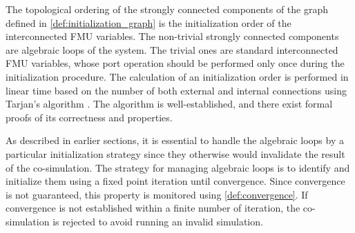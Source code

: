 The topological ordering of the strongly connected components of the graph defined in \cref{def:initialization_graph} is the initialization order of the interconnected FMU variables. 
The non-trivial strongly connected components are algebraic loops of the system. The trivial ones are standard interconnected FMU variables, whose port operation should be performed only once during the initialization procedure.
The calculation of an initialization order is performed in linear time based on the number of both external and internal connections using Tarjan's algorithm \cite{tarjan_1972}. 
The algorithm is well-established, and there exist formal proofs of its correctness and properties\cite{stefanMerz}. 

As described in earlier sections, it is essential to handle the algebraic loops by a particular initialization strategy since they otherwise would invalidate the result of the co-simulation. The strategy for managing algebraic loops is to identify and initialize them using a fixed point iteration until convergence. Since convergence is not guaranteed, this property is monitored using \cref{def:convergence}. If convergence is not established within a finite number of iteration, the co-simulation is rejected to avoid running an invalid simulation.

